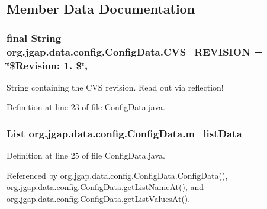 \subsection{Member Data Documentation}
\hypertarget{classorg_1_1jgap_1_1data_1_1config_1_1_config_data_a6a8e8e2534f00c79e3ed9c688da3ff65}{
\subsubsection[{C\-V\-S\-\_\-\-R\-E\-V\-I\-S\-I\-O\-N}]{\setlength{\rightskip}{0pt plus 5cm}final String org.\-jgap.\-data.\-config.\-Config\-Data.\-C\-V\-S\-\_\-\-R\-E\-V\-I\-S\-I\-O\-N = \char`\"{}\$Revision\-: 1. \$\char`\"{}\hspace{0.3cm}{\ttfamily [static]}, {\ttfamily [private]}}}\label{classorg_1_1jgap_1_1data_1_1config_1_1_config_data_a6a8e8e2534f00c79e3ed9c688da3ff65}
String containing the C\-V\-S revision. Read out via reflection! 

Definition at line 23 of file Config\-Data.\-java.

\hypertarget{classorg_1_1jgap_1_1data_1_1config_1_1_config_data_a04b312becd5fd3cf9d4c98c115a4c612}{
\subsubsection[{m\-\_\-list\-Data}]{\setlength{\rightskip}{0pt plus 5cm}List org.\-jgap.\-data.\-config.\-Config\-Data.\-m\-\_\-list\-Data\hspace{0.3cm}{\ttfamily [private]}}}\label{classorg_1_1jgap_1_1data_1_1config_1_1_config_data_a04b312becd5fd3cf9d4c98c115a4c612}


Definition at line 25 of file Config\-Data.\-java.



Referenced by org.\-jgap.\-data.\-config.\-Config\-Data.\-Config\-Data(), org.\-jgap.\-data.\-config.\-Config\-Data.\-get\-List\-Name\-At(), and org.\-jgap.\-data.\-config.\-Config\-Data.\-get\-List\-Values\-At().


